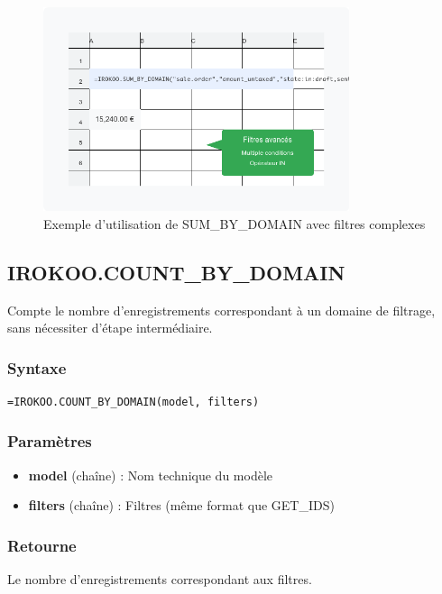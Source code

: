 \documentclass[12pt, a4paper]{article}
\begin{document}
\begin{figure}[H]
    \centering
    \includegraphics[width=0.8\textwidth]{feature2.png}
    \caption{Exemple d'utilisation de SUM\_BY\_DOMAIN avec filtres complexes}
\end{figure}

\subsection{IROKOO.COUNT\_BY\_DOMAIN}
\begin{tcolorbox}[title=Description]
Compte le nombre d'enregistrements correspondant à un domaine de filtrage, sans nécessiter d'étape intermédiaire.
\end{tcolorbox}

\subsubsection{Syntaxe}
\begin{lstlisting}
=IROKOO.COUNT_BY_DOMAIN(model, filters)
\end{lstlisting}

\subsubsection{Paramètres}
\begin{itemize}
    \item \textbf{model} (chaîne) : Nom technique du modèle
    \item \textbf{filters} (chaîne) : Filtres (même format que GET\_IDS)
\end{itemize}

\subsubsection{Retourne}
Le nombre d'enregistrements correspondant aux filtres.
\end{document}

